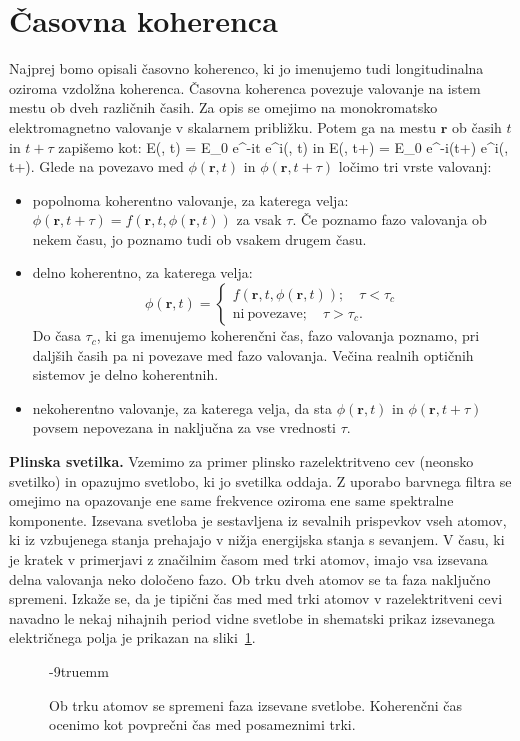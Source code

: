 \section{Časovna koherenca}
Najprej bomo opisali časovno koherenco, ki jo imenujemo tudi longitudinalna 
oziroma vzdolžna koherenca. Časovna koherenca povezuje valovanje na istem mestu 
ob dveh različnih časih. Za opis se omejimo na monokromatsko elektromagnetno 
valovanje v skalarnem približku. 
Potem ga na mestu $\mathbf{r}$ ob časih $t$ in $t+\tau$ zapišemo kot:
\beq
E(, t) = E_0 e^{-i\omega t} e^{i\phi(, t)}
\label{eq:08_02}
\eeq
in
\beq
E(, t+\tau) = E_0 e^{-i\omega (t+\tau)} e^{i\phi(, t+\tau)}.
\label{eq:08_03}
\eeq
Glede na povezavo med $\phi(\mathbf{r}, t)$ in $\phi(\mathbf{r}, t+\tau)$ 
ločimo tri vrste valovanj:
\begin{itemize}
 \item popolnoma koherentno valovanje, za katerega velja: $\phi(\mathbf{r}, t+\tau) = 
 f(\mathbf{r}, t, \phi(\mathbf{r}, t))$ za vsak $\tau$. Če poznamo fazo valovanja ob 
 nekem času, jo poznamo tudi ob vsakem drugem času.
 \item delno koherentno, za katerega velja:
\begin{equation}
\phi(\mathbf{r}, t)=\begin{cases}
f(\mathbf{r}, t, \phi(\mathbf{r}, t)); \quad \tau < \tau_c\\
\mathrm{ni~povezave}; \quad \tau > \tau_c.
\end{cases}
\label{eq:08_04}
\end{equation}
Do časa $\tau_c$, ki ga imenujemo koherenčni čas, fazo valovanja 
poznamo, pri daljših časih pa ni povezave med fazo valovanja. Večina
realnih optičnih sistemov je delno koherentnih.
 \item nekoherentno valovanje, za katerega velja, da
 sta $\phi(\mathbf{r}, t)$ in $\phi(\mathbf{r}, t+\tau)$
 povsem nepovezana in naključna za vse vrednosti $\tau$.
\end{itemize}
\begin{example}{\bf Plinska svetilka.}
Vzemimo za primer plinsko razelektritveno cev (neonsko svetilko) in 
opazujmo svetlobo, ki jo svetilka oddaja. Z uporabo barvnega 
filtra se omejimo na opazovanje ene same frekvence oziroma 
ene same spektralne komponente. Izsevana svetloba je sestavljena iz
sevalnih prispevkov vseh atomov, ki iz vzbujenega stanja prehajajo v 
nižja energijska stanja s sevanjem. V času, ki je kratek v primerjavi 
z značilnim časom med trki atomov, imajo vsa izsevana delna valovanja 
neko določeno fazo. Ob trku dveh atomov se ta faza naključno spremeni. 
Izkaže se, da je tipični čas med med trki atomov v razelektritveni cevi 
navadno le nekaj nihajnih period vidne svetlobe in shematski prikaz
izsevanega električnega polja je prikazan na sliki~\ref{fig:08_neon}.
\begin{figure}[h!]
\centering
\def\svgwidth{80truemm} 

\caption{Ob trku atomov se spremeni faza izsevane svetlobe. Koherenčni
čas ocenimo kot povprečni čas med posameznimi trki.
}
\label{fig:08_neon}
\vglue-9truemm
\end{figure}

\end{example}

